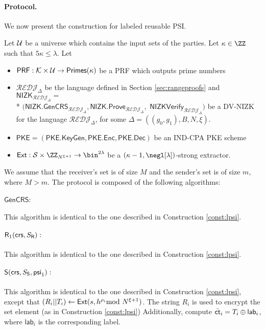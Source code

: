 \paragraph{Protocol.} We now present the construction for labeled reusable PSI.
 
\begin{construction}
\label{const:llpsi}
Let $\mathcal{U}$ be a universe which contains the input sets of the parties. Let $\kappa\in\ZZ$ such that $5\kappa\leq \lambda$. Let
\begin{itemize}
    \item $\mathsf{PRF}:\mathcal{K}\times \mathcal{U}\to \mathsf{Primes}(\kappa)$ be a PRF which outputs prime numbers
    \item $\mathcal{REDJ}_{\Delta}$ be the language defined in Section \ref{sec:rangeproofs} and   $\mathsf{NIZK}_{\mathcal{REDJ}_{\Delta}}=$\\* $(\mathsf{NIZK.GenCRS}_{\mathcal{REDJ}_{\Delta}},\mathsf{NIZK.Prove}_{\mathcal{REDJ}_{\Delta}},$ $\mathsf{NIZKVerify}_{\mathcal{REDJ}_{\Delta}})$ be a DV-NIZK for the language $\mathcal{REDJ}_{\Delta}$,  for some $\Delta=((g_0,g_1),B,N,\xi)$. 
    \item $\mathsf{PKE}=(\mathsf{PKE.KeyGen}, \mathsf{PKE.Enc},\mathsf{PKE.Dec})$ be an IND-CPA PKE scheme
    \item $\mathsf{Ext}:\Sc\times \ZZ_{N^{\xi+1}}\to\bin^{2\lambda}$ be a $(\kappa-1,\negl[\lambda])$-strong extractor.
\end{itemize}
We assume that the receiver's set is of size $M$ and the sender's set is of size $m$, where $M>m$. 
The protocol is composed of the following algorithms:
\paragraph{$\mathsf{GenCRS}:$} This algorithm is identical to the one described in Construction \ref{const:lpsi}.%
\paragraph{$\mathsf{R}_1(\mathsf{crs},S_{\mathsf{R}}):$} This algorithm is identical to the one described in Construction \ref{const:lpsi}.


\paragraph{$\mathsf{S}(\mathsf{crs},S_{\mathsf{S}},\mathsf{psi}_1):$} This algorithm is identical to the one described in Construction \ref{const:lpsi}, except that $(R_i||T_i)\leftarrow\mathsf{Ext}(s,h^{\rho_i}\!\!\!\!\mod N^{\xi+1})$. The string $R_i$ is used to encrypt the set element (as in Construction \ref{const:lpsi}) Additionally, compute $\bar{\mathsf{ct}}_i=T_i\oplus \mathsf{lab}_i$, where $\mathsf{lab}_i$ is the corresponding label.


\end{construction}
